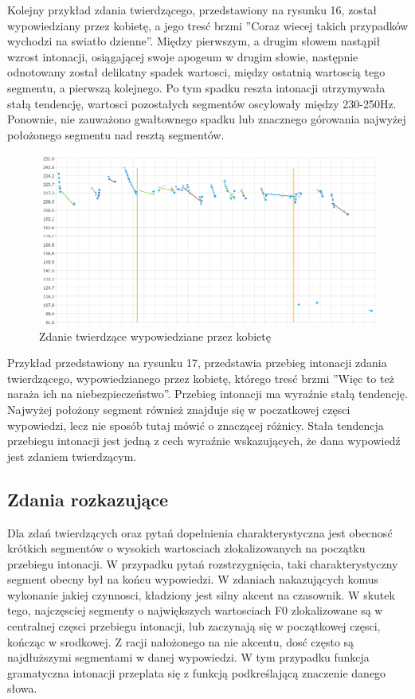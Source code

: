 \documentclass[a4paper,12 pt]{article}
\begin{document}
\FloatBarrier
Kolejny przykład zdania twierdzącego, przedstawiony na rysunku 16, został wypowiedziany przez kobietę, a jego tresć brzmi ''Coraz wiecej takich przypadków wychodzi na swiatło dzienne''. Między pierwszym, a drugim słowem nastąpił wzrost intonacji, osiągającej swoje apogeum w drugim słowie, następnie odnotowany został delikatny spadek wartosci, między ostatnią wartoscią tego segmentu, a pierwszą kolejnego. Po tym spadku reszta intonacji utrzymywała stałą tendencję, wartosci pozostałych segmentów oscylowały między 230-250Hz. Ponownie, nie zauważono gwałtownego spadku lub znacznego górowania najwyżej położonego segmentu nad resztą segmentów.
 \FloatBarrier
\begin{figure}[h]
\centering
\includegraphics[scale=0.7]{twierdzace_narazac.png}
\caption{Zdanie twierdzące wypowiedziane przez kobietę}
\end{figure}
\FloatBarrier
Przykład przedstawiony na rysunku 17, przedstawia przebieg intonacji zdania twierdzącego, wypowiedzianego przez kobietę, którego tresć brzmi ''Więc to też naraża ich na niebezpieczeństwo''. Przebieg intonacji ma wyraźnie stałą tendencję. Najwyżej położony segment również znajduje się w poczatkowej częsci wypowiedzi, lecz nie sposób tutaj mówić o znaczącej różnicy. Stała tendencja przebiegu intonacji jest jedną z cech wyraźnie wskazujących, że dana wypowiedź jest zdaniem twierdzącym.
\subsection{Zdania rozkazujące}
Dla zdań twierdzących oraz pytań dopełnienia charakterystyczna jest obecnosć krótkich segmentów o wysokich wartosciach zlokalizowanych na początku przebiegu intonacji. W przypadku pytań rozstrzygnięcia, taki charakterystyczny segment obecny był na końcu wypowiedzi. W zdaniach nakazujących komus wykonanie jakiej czynnosci, kładziony jest silny akcent na czasownik. W skutek tego, najczęsciej segmenty o największych wartosciach F0 zlokalizowane są w centralnej częsci przebiegu intonacji, lub zaczynają się w początkowej częsci, kończąc w srodkowej. Z racji nałożonego na nie akcentu, dosć często są najdłuższymi segmentami w danej wypowiedzi. W tym przypadku funkcja gramatyczna intonacji przeplata się z funkcją podkreślającą znaczenie danego słowa.
\end{document}
